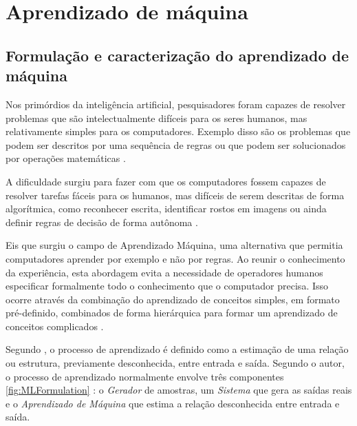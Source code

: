 
\chapter{Aprendizado de máquina}
\label{chap:MachineLearning}

\section{Formulação e caracterização do aprendizado de máquina}

Nos primórdios da inteligência artificial, pesquisadores foram capazes de resolver problemas que são intelectualmente difíceis para os seres humanos, mas relativamente simples para os computadores. Exemplo disso são os problemas que podem ser descritos por uma sequência de regras ou que podem ser solucionados por operações matemáticas \cite{Goodfellow-et-al-2016}.

A dificuldade surgiu para fazer com que os computadores fossem capazes de resolver tarefas fáceis para os humanos, mas difíceis de serem descritas de forma algorítmica, como reconhecer escrita, identificar rostos em imagens ou ainda definir regras de decisão de forma autônoma \cite{Goodfellow-et-al-2016}.

Eis que surgiu o campo de Aprendizado Máquina, uma alternativa que permitia computadores aprender por exemplo e não por regras. Ao reunir o conhecimento da experiência, esta abordagem evita a necessidade de operadores humanos especificar formalmente todo o conhecimento que o computador precisa. Isso ocorre através da combinação do aprendizado de conceitos simples, em formato pré-definido, combinados de forma hierárquica para formar um aprendizado de conceitos complicados \cite{Goodfellow-et-al-2016}.

Segundo , o processo de aprendizado é definido como a estimação de uma relação ou estrutura, previamente desconhecida, entre entrada e saída. Segundo o autor, o processo de aprendizado normalmente envolve três componentes \ref{fig:MLFormulation} : o \textit{Gerador} de amostras, um \textit{Sistema} que gera as saídas reais e o \textit{Aprendizado de Máquina} que estima a relação desconhecida entre entrada e saída. 

